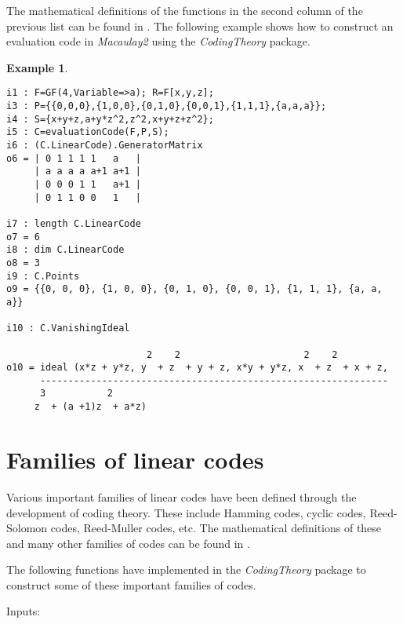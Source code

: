 \documentclass[12pt]{amsart}
\theoremstyle{plain}
\newtheorem{example}[theorem]{Example}
\begin{document}
\medskip

The mathematical definitions of the functions in the second column of the previous list can be found in \cite{CSTVV}. The following example shows how to construct an evaluation code in {\it Macaulay2} using the {\it CodingTheory} package.

\begin{example}
$\,$
\begin{verbatim}
i1 : F=GF(4,Variable=>a); R=F[x,y,z];
i3 : P={{0,0,0},{1,0,0},{0,1,0},{0,0,1},{1,1,1},{a,a,a}};
i4 : S={x+y+z,a+y*z^2,z^2,x+y+z+z^2};
i5 : C=evaluationCode(F,P,S);
i6 : (C.LinearCode).GeneratorMatrix
o6 = | 0 1 1 1 1   a   |
     | a a a a a+1 a+1 |
     | 0 0 0 1 1   a+1 |
     | 0 1 1 0 0   1   |

i7 : length C.LinearCode
o7 = 6
i8 : dim C.LinearCode
o8 = 3
i9 : C.Points
o9 = {{0, 0, 0}, {1, 0, 0}, {0, 1, 0}, {0, 0, 1}, {1, 1, 1}, {a, a, a}}

i10 : C.VanishingIdeal

                         2    2                      2    2              
o10 = ideal (x*z + y*z, y  + z  + y + z, x*y + y*z, x  + z  + x + z, 
      --------------------------------------------------------------
      3           2
     z  + (a +1)z  + a*z)
\end{verbatim}
\end{example}


\section{Families of linear codes}\label{families}

Various important families of linear codes have been defined through the development of coding theory. These include Hamming codes, cyclic codes, Reed-Solomon codes, Reed-Muller codes, etc. The mathematical definitions of these and many other families of codes can be found in \cite{huf-pless,MacWilliams-Sloane,van-lint}.

The following functions have implemented in the {\it CodingTheory} package to construct some of these important families of codes.

\medskip
 
Inputs:

\medskip
\end{document}
